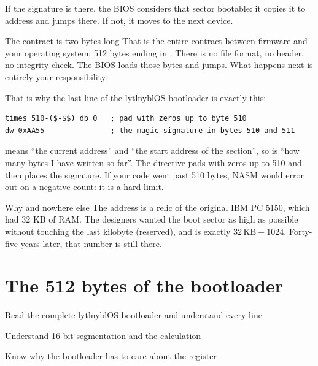 If the signature is there, the BIOS considers that sector bootable: it copies it to address
 and jumps there. If not, it moves to the next device.

\begin{concept}{The contract is two bytes long}
That is the entire contract between firmware and your operating system: 512 bytes ending in
. There is no file format, no header, no integrity check. The BIOS loads those bytes and
jumps. What happens next is entirely your responsibility.
\end{concept}

That is why the last line of the lytlnyblOS bootloader is exactly this:

\begin{lstlisting}[style=asm]
times 510-($-$$) db 0   ; pad with zeros up to byte 510
dw 0xAA55               ; the magic signature in bytes 510 and 511
\end{lstlisting}

\cod{\$} means ``the current address'' and \cod{\$\$} ``the start address of the section'', so
\cod{\$-\$\$} is ``how many bytes I have written so far''. The directive pads with zeros up to 510
and then places the signature. If your code went past 510 bytes, NASM would error out on a negative
count: it is a hard limit.

\begin{warn}{Why  and nowhere else}
The address  is a relic of the original IBM PC 5150, which had 32 KB of RAM. The
designers wanted the boot sector as high as possible without touching the last kilobyte (reserved),
and  is exactly $32\,\text{KB} - 1024$. Forty-five years later, that number is still
there.
\end{warn}

\chapter{The 512 bytes of the bootloader}

\begin{goals}
  \item Read the complete lytlnyblOS bootloader and understand every line
  \item Understand 16-bit segmentation and the  calculation
  \item Know why the bootloader has to care about the  register
\end{goals}

